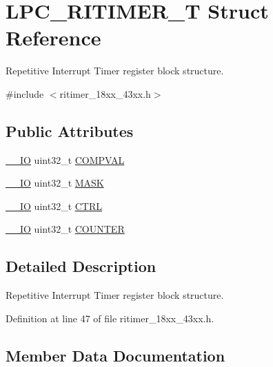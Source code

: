 \hypertarget{struct_l_p_c___r_i_t_i_m_e_r___t}{}\section{L\+P\+C\+\_\+\+R\+I\+T\+I\+M\+E\+R\+\_\+T Struct Reference}
\label{struct_l_p_c___r_i_t_i_m_e_r___t}


Repetitive Interrupt Timer register block structure.  




{\ttfamily \#include $<$ritimer\+\_\+18xx\+\_\+43xx.\+h$>$}

\subsection*{Public Attributes}
\begin{DoxyCompactItemize}
\item 
\hyperlink{core__sc300_8h_aec43007d9998a0a0e01faede4133d6be}{\+\_\+\+\_\+\+IO} uint32\+\_\+t \hyperlink{struct_l_p_c___r_i_t_i_m_e_r___t_ad2d432e990697ef43731307843b84020}{C\+O\+M\+P\+V\+AL}
\item 
\hyperlink{core__sc300_8h_aec43007d9998a0a0e01faede4133d6be}{\+\_\+\+\_\+\+IO} uint32\+\_\+t \hyperlink{struct_l_p_c___r_i_t_i_m_e_r___t_a7d37943073d12cea677f592c799a1908}{M\+A\+SK}
\item 
\hyperlink{core__sc300_8h_aec43007d9998a0a0e01faede4133d6be}{\+\_\+\+\_\+\+IO} uint32\+\_\+t \hyperlink{struct_l_p_c___r_i_t_i_m_e_r___t_a059e4d52058cb51138a8ba62445a8cba}{C\+T\+RL}
\item 
\hyperlink{core__sc300_8h_aec43007d9998a0a0e01faede4133d6be}{\+\_\+\+\_\+\+IO} uint32\+\_\+t \hyperlink{struct_l_p_c___r_i_t_i_m_e_r___t_ab7525ee2044799497ef2f87d3f974b8b}{C\+O\+U\+N\+T\+ER}
\end{DoxyCompactItemize}


\subsection{Detailed Description}
Repetitive Interrupt Timer register block structure. 

Definition at line 47 of file ritimer\+\_\+18xx\+\_\+43xx.\+h.



\subsection{Member Data Documentation}
\mbox{\label{struct_l_p_c___r_i_t_i_m_e_r___t_ad2d432e990697ef43731307843b84020}} 
